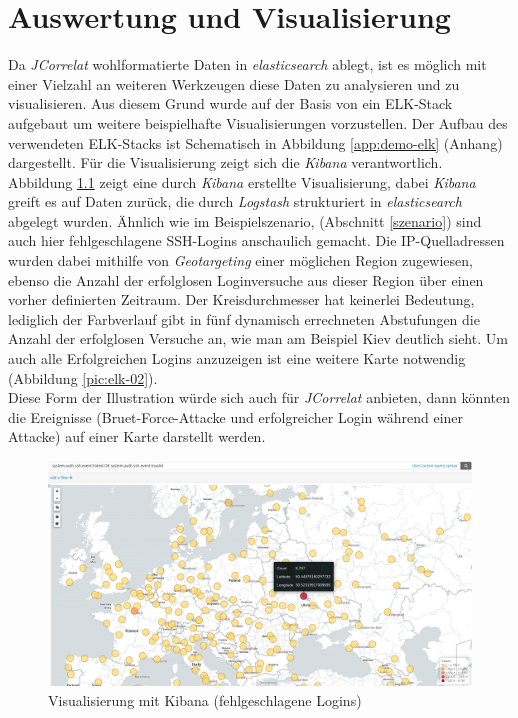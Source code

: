 \chapter{Auswertung und Visualisierung}\label{ausblick}
\thispagestyle{fancy}

Da \textit{JCorrelat} wohlformatierte Daten in \textit{elasticsearch} ablegt, ist es 
möglich mit einer Vielzahl an weiteren Werkzeugen diese Daten zu analysieren und zu 
visualisieren. Aus diesem Grund wurde auf der Basis von \cite{kleindienst} ein 
ELK-Stack aufgebaut um weitere beispielhafte Visualisierungen vorzustellen. Der 
Aufbau des verwendeten ELK-Stacks ist Schematisch in Abbildung \ref{app:demo-elk} (Anhang)
dargestellt. Für die Visualisierung zeigt sich die \textit{Kibana} verantwortlich.\\
Abbildung \ref{pic:elk-01} zeigt eine durch \textit{Kibana} erstellte Visualisierung, 
dabei \textit{Kibana} greift es auf Daten zurück, die durch \textit{Logstash} 
strukturiert in \textit{elasticsearch} abgelegt wurden.
Ähnlich wie im Beispielszenario, (Abschnitt \ref{szenario}) sind auch hier 
fehlgeschlagene SSH-Logins anschaulich gemacht. Die IP-Quelladressen wurden dabei 
mithilfe von \textit{Geotargeting} einer möglichen Region zugewiesen, ebenso die Anzahl 
der erfolglosen Loginversuche aus dieser Region über einen vorher definierten Zeitraum. 
Der Kreisdurchmesser hat keinerlei Bedeutung, lediglich der Farbverlauf gibt in fünf 
dynamisch errechneten Abstufungen die Anzahl der erfolglosen Versuche an, wie man am 
Beispiel Kiev deutlich sieht. Um auch alle Erfolgreichen Logins anzuzeigen ist eine 
weitere Karte notwendig (Abbildung \ref{pic:elk-02}).\\
Diese Form der Illustration würde sich auch für \textit{JCorrelat} anbieten, dann 
könnten die Ereignisse (Bruet-Force-Attacke und erfolgreicher Login während einer Attacke)
auf einer Karte darstellt werden.

\begin{figure}[htbp]
    \caption{Visualisierung mit Kibana (fehlgeschlagene Logins)}
    \label{pic:elk-01}\vspace{0.2cm}
    \centering
    \includegraphics[scale=0.28]{img/elk-01}  
\end{figure}

